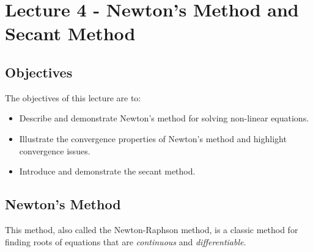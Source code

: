 \chapter{Lecture 4 - Newton's Method and Secant Method}
\label{ch:lec4n}
\section{Objectives}
The objectives of this lecture are to:
\begin{itemize}
\item Describe and demonstrate Newton's method for solving non-linear equations.
\item Illustrate the convergence properties of Newton's method and highlight convergence issues.
\item Introduce and demonstrate the secant method.
\end{itemize}
\setcounter{lstannotation}{0}

\section{Newton's Method}

This method, also called the Newton-Raphson method, is a classic method for finding roots of equations that are \emph{continuous} and \emph{differentiable}.
